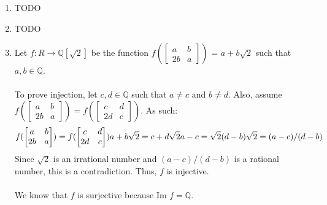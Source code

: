 \documentclass{article}
\begin{document}
\begin{enumerate}
\item TODO

\item TODO

\item Let $f: R \rightarrow \mathbb{Q}[\sqrt{2}]$ be the function
$f(\begin{bmatrix} a & b \\ 2b & a \end{bmatrix})$ = $a + b\sqrt2$ such that
$a, b \in \mathbb{Q}$. \\ \\

To prove injection, let $c, d \in \mathbb{Q}$ such that $a \neq c$ and $b \neq d$.
Also, assume $f(\begin{bmatrix} a & b \\ 2b & a \end{bmatrix}) = f(\begin{bmatrix} c & d \\ 2d & c \end{bmatrix})$.
As such:
\[
f(\begin{bmatrix} a & b \\ 2b & a \end{bmatrix}) = f(\begin{bmatrix} c & d \\ 2d & c \end{bmatrix}) \\
a + b\sqrt2 = c + d\sqrt2
a - c = \sqrt{2}(d - b)
\sqrt2 = (a - c)/(d - b)
\]
Since $\sqrt2$ is an irrational number and $(a-c)/(d-b)$ is a rational number,
this is a contradiction.  Thus, $f$ is injective. \\ \\
We know that $f$ is surjective because Im $f = \mathbb{Q}$. \\ \\


\end{enumerate}
\end{document}
